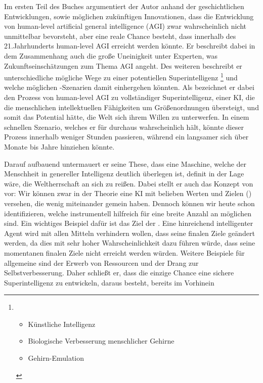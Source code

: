 \documentclass[twoside, a4paper, DIV=11, open=any, bibliography=totoc]{scrbook}
\begin{document}
Im ersten Teil des Buches argumentiert der Autor anhand der geschichtlichen Entwicklungen,
sowie möglichen zukünftigen Innovationen, dass die Entwicklung von human-level artificial
general intelligence (AGI) zwar wahrscheinlich nicht unmittelbar bevorsteht, aber
eine reale Chance besteht, dass innerhalb des 21.Jahrhunderts human-level AGI
erreicht werden könnte. Er beschreibt dabei in dem Zusammenhang auch die große
Uneinigkeit unter Experten, was Zukunftseinschätzungen zum Thema AGI angeht.
Des weiteren beschreibt er unterschiedliche mögliche Wege zu einer potentiellen
Superintelligenz
\footnote{\begin{itemize}
  \item Künstliche Intelligenz
  \item Biologische Verbesserung menschlicher Gehirne
  \item Gehirn-Emulation
\end{itemize}}
und welche möglichen -Szenarien damit einhergehen könnten.
Als  bezeichnet er dabei den Prozess von human-level AGI zu
vollständiger Superintelligenz, einer KI, die die menschlichen intellektuellen Fähigkeiten
um Größenordnungen übersteigt, und somit das Potential hätte, die Welt sich ihrem
Willen zu unterwerfen. In einem schnellen Szenario, welches er für durchaus
wahrscheinlich hält, könnte dieser Prozess innerhalb
weniger Stunden passieren, während ein langsamer  sich über Monate
bis Jahre hinziehen könnte.

Darauf aufbauend untermauert er seine These, dass eine Maschine, welche der Menschheit
in genereller Intelligenz deutlich überlegen ist, definit in der Lage wäre,
die Weltherrschaft an sich zu reißen. Dabei stellt er auch das Konzept von
 vor: Wir können zwar in der Theorie eine KI
mit belieben Werten und Zielen () versehen, die wenig miteinander gemein haben.
Dennoch können wir heute schon  identifizieren, welche
instrumentell hilfreich für eine breite Anzahl an möglichen  sind.
Ein wichtiges Beispiel dafür ist das Ziel der . Eine hinreichend
intelligenter Agent wird mit allen Mitteln verhindern wollen, dass seine finalen Ziele
geändert werden, da dies mit sehr hoher Wahrscheinlichkeit dazu führen würde,
dass seine momentanen finalen Ziele nicht erreicht werden würden. Weitere Beispiele
für allgemeine  sind der Erwerb von Ressourcen und der
Drang zur Selbstverbesserung.
Daher schließt er, dass die einzige Chance eine sichere Superintelligenz zu entwickeln,
daraus besteht, bereits im Vorhinein
\end{document}
